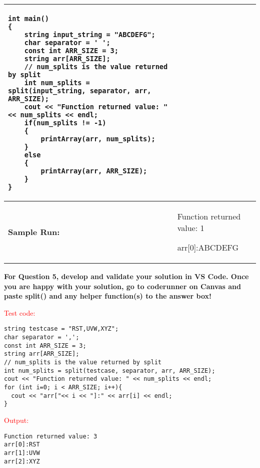 \begin{longtable}[H]{|p{1.7in}|p{4.0in}|}
\begin{example}
\begin{verbatim}
int main()
{
    string input_string = "ABCDEFG";
    char separator = ' ';
    const int ARR_SIZE = 3;
    string arr[ARR_SIZE];
    // num_splits is the value returned by split
    int num_splits = split(input_string, separator, arr, ARR_SIZE);
    cout << "Function returned value: " << num_splits << endl;
    if(num_splits != -1) 
    {
        printArray(arr, num_splits); 
    } 
    else 
    {
        printArray(arr, ARR_SIZE);
    }
}

        \end{verbatim}
                \end{example} 

\\ \hline
        \textbf{Sample Run:} &  
        \begin{sample}
Function returned value: 1

arr[0]:ABCDEFG
        \end{sample}

             \\ \hline
\end{longtable}


\textbf{For Question 5, develop and validate your solution in VS Code. Once you are happy with your solution, go to coderunner on Canvas and paste split() and any helper function(s) to the answer box!}

\begin{sample}
\textcolor{red}{Test code:}
\begin{verbatim}
string testcase = "RST,UVW,XYZ";
char separator = ',';
const int ARR_SIZE = 3;
string arr[ARR_SIZE];
// num_splits is the value returned by split
int num_splits = split(testcase, separator, arr, ARR_SIZE);
cout << "Function returned value: " << num_splits << endl;
for (int i=0; i < ARR_SIZE; i++){
  cout << "arr["<< i << "]:" << arr[i] << endl;
}
\end{verbatim}
\textcolor{red}{Output:}
\begin{verbatim}
Function returned value: 3
arr[0]:RST
arr[1]:UVW
arr[2]:XYZ
\end{verbatim}
\end{sample}

